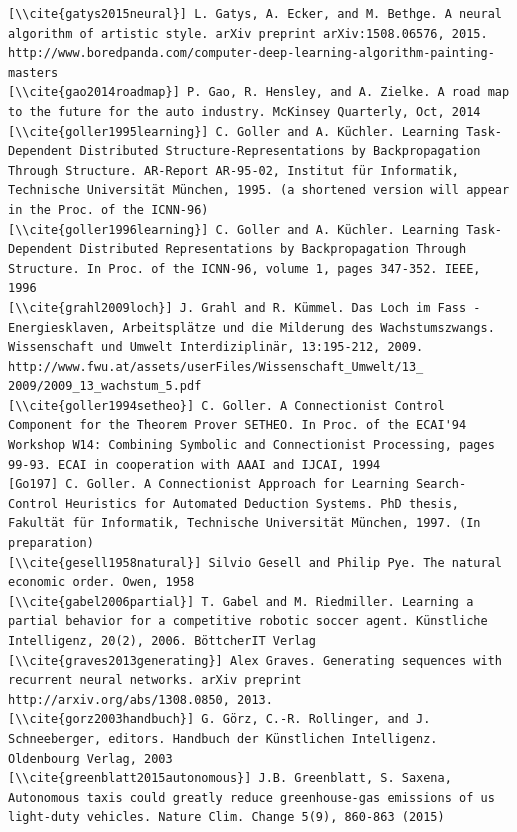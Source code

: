 \documentclass[10pt]{book}
\begin{document}
\begin{verbatim}
[\\cite{gatys2015neural}] L. Gatys, A. Ecker, and M. Bethge. A neural algorithm of artistic style. arXiv preprint arXiv:1508.06576, 2015. http://www.boredpanda.com/computer-deep-learning-algorithm-painting-masters
[\\cite{gao2014roadmap}] P. Gao, R. Hensley, and A. Zielke. A road map to the future for the auto industry. McKinsey Quarterly, Oct, 2014
[\\cite{goller1995learning}] C. Goller and A. Küchler. Learning Task-Dependent Distributed Structure-Representations by Backpropagation Through Structure. AR-Report AR-95-02, Institut für Informatik, Technische Universität München, 1995. (a shortened version will appear in the Proc. of the ICNN-96)
[\\cite{goller1996learning}] C. Goller and A. Küchler. Learning Task-Dependent Distributed Representations by Backpropagation Through Structure. In Proc. of the ICNN-96, volume 1, pages 347-352. IEEE, 1996
[\\cite{grahl2009loch}] J. Grahl and R. Kümmel. Das Loch im Fass - Energiesklaven, Arbeitsplätze und die Milderung des Wachstumszwangs. Wissenschaft und Umwelt Interdiziplinär, 13:195-212, 2009. http://www.fwu.at/assets/userFiles/Wissenschaft_Umwelt/13_ 2009/2009_13_wachstum_5.pdf
[\\cite{goller1994setheo}] C. Goller. A Connectionist Control Component for the Theorem Prover SETHEO. In Proc. of the ECAI'94 Workshop W14: Combining Symbolic and Connectionist Processing, pages 99-93. ECAI in cooperation with AAAI and IJCAI, 1994
[Go197] C. Goller. A Connectionist Approach for Learning Search-Control Heuristics for Automated Deduction Systems. PhD thesis, Fakultät für Informatik, Technische Universität München, 1997. (In preparation)
[\\cite{gesell1958natural}] Silvio Gesell and Philip Pye. The natural economic order. Owen, 1958
[\\cite{gabel2006partial}] T. Gabel and M. Riedmiller. Learning a partial behavior for a competitive robotic soccer agent. Künstliche Intelligenz, 20(2), 2006. BöttcherIT Verlag
[\\cite{graves2013generating}] Alex Graves. Generating sequences with recurrent neural networks. arXiv preprint http://arxiv.org/abs/1308.0850, 2013.
[\\cite{gorz2003handbuch}] G. Görz, C.-R. Rollinger, and J. Schneeberger, editors. Handbuch der Künstlichen Intelligenz. Oldenbourg Verlag, 2003
[\\cite{greenblatt2015autonomous}] J.B. Greenblatt, S. Saxena, Autonomous taxis could greatly reduce greenhouse-gas emissions of us light-duty vehicles. Nature Clim. Change 5(9), 860-863 (2015)

\end{verbatim}
\end{document}
